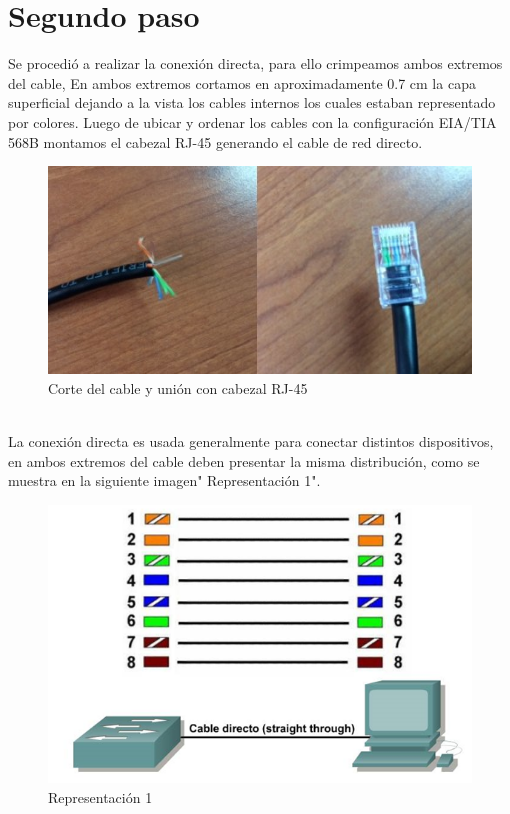 \documentclass[spanish]{udpreport}
\begin{document}
\section{Segundo paso}
Se procedió a realizar la conexión directa, para ello crimpeamos ambos extremos del cable, En ambos extremos cortamos en aproximadamente 0.7 cm la capa superficial dejando a la vista los cables internos los cuales estaban representado por colores. Luego de ubicar y ordenar los cables con la configuración EIA/TIA 568B montamos el cabezal RJ-45 generando el cable de red directo.
\begin{figure}[h]
    \centering
    \includegraphics[scale=0.2]{images/2.jpg}
    \caption{Corte del cable y unión con cabezal RJ-45}
    \label{fig:my_label}
\end{figure}
\\
La conexión directa es usada generalmente para conectar  distintos dispositivos, en ambos extremos del cable deben presentar la misma distribución, como se muestra en la siguiente imagen" Representación 1".
\begin{figure}[h]
    \centering
    \includegraphics[scale=0.2]{images/direc.png}
    \caption{Representación 1 }
    \label{fig:my_label}
\end{figure}
\newpage
\end{document}
